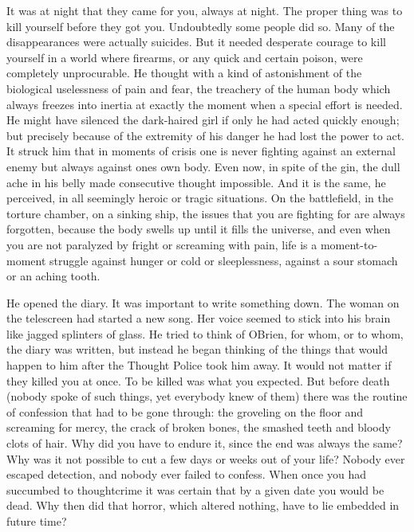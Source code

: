 It was at night that they came for you, always at night. The proper
thing was to kill yourself before they got you. Undoubtedly some people
did so. Many of the disappearances were actually suicides. But it needed
desperate courage to kill yourself in a world where firearms, or any
quick and certain poison, were completely unprocurable. He thought with
a kind of astonishment of the biological uselessness of pain and fear,
the treachery of the human body which always freezes into inertia at
exactly the moment when a special effort is needed. He might have
silenced the dark-haired girl if only he had acted quickly enough; but
precisely because of the extremity of his danger he had lost the power
to act. It struck him that in moments of crisis one is never fighting
against an external enemy but always against one\textquotesingle s own
body. Even now, in spite of the gin, the dull ache in his belly made
consecutive thought impossible. And it is the same, he perceived, in all
seemingly heroic or tragic situations. On the battlefield, in the
torture chamber, on a sinking ship, the issues that you are fighting for
are always forgotten, because the body swells up until it fills the
universe, and even when you are not paralyzed by fright or screaming
with pain, life is a moment-to-moment struggle against hunger or cold or
sleeplessness, against a sour stomach or an aching tooth.

He opened the diary. It was important to write something down. The woman
on the telescreen had started a new song. Her voice seemed to stick into
his brain like jagged splinters of glass. He tried to think of
O\textquotesingle Brien, for whom, or to whom, the diary was written,
but instead he began thinking of the things that would happen to him
after the Thought Police took him away. It would not matter if they
killed you at once. To be killed was what you expected. But before death
(nobody spoke of such things, yet everybody knew of them) there was the
routine of confession that had to be gone through: the groveling on the
floor and screaming for mercy, the crack of broken bones, the smashed
teeth and bloody clots of hair. Why did you have to endure it, since the
end was always the same? Why was it not possible to cut a few days or
weeks out of your life? Nobody ever escaped detection, and nobody ever
failed to confess. When once you had succumbed to thoughtcrime it was
certain that by a given date you would be dead. Why then did that
horror, which altered nothing, have to lie embedded in future time?

